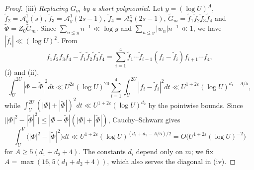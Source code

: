 \documentclass[11pt]{amsart}
\theoremstyle{remark}
\newcommand{\cA}{\mathcal{A}}
\begin{document}
\begin{proof}
(iii) \emph{Replacing $G_m$ by a short polynomial.} Let $y=(\log U)^A$, $\tilde f_2=\cA^1_y(s)$, $\tilde f_3=\cA^1_y(2s-1)$, $\tilde f_4=\cA^{\chi}_y(2s-1)$, $\widetilde G_m=\tilde f_1\tilde f_2\tilde f_3\tilde f_4$ and $\widetilde\Phi=Z_0\widetilde G_m$. Since $\sum_{n\le y}n^{-1}\ll\log y$ and $\sum_{n\le y}|w_n|n^{-1}\ll1$, we have $|\tilde f_i|\ll(\log U)^2$. From
\[
f_1f_2f_3f_4-\tilde f_1\tilde f_2\tilde f_3\tilde f_4=\sum_{i=1}^4\tilde f_1\cdots\tilde f_{i-1}(f_i-\tilde f_i)f_{i+1}\cdots f_4,
\]
(i) and (ii),
\[
\int_U^{2U}|\Phi-\widetilde\Phi|^2dt\ll U^{2\varepsilon}(\log U)^{20}\sum_{i=1}^4\int_U^{2U}|f_i-\tilde f_i|^2dt\ll U^{1+2\varepsilon}(\log U)^{d_1-A/5},
\]
while $\int_U^{2U}(|\Phi|+|\widetilde\Phi|)^2dt\ll U^{1+2\varepsilon}(\log U)^{d_2}$ by the pointwise bounds. Since $\big||\Phi|^2-|\widetilde\Phi|^2\big|\le|\Phi-\widetilde\Phi|(|\Phi|+|\widetilde\Phi|)$, Cauchy--Schwarz gives
\[
\int_U^V\big(|\Phi|^2-|\widetilde\Phi|^2\big)dt\ll U^{1+2\varepsilon}(\log U)^{(d_1+d_2-A/5)/2}=O\big(U^{1+2\varepsilon}(\log U)^{-2}\big)
\]
for $A\ge5(d_1+d_2+4)$. The constants $d_i$ depend only on $m$; we fix $A=\max(16,5(d_1+d_2+4))$, which also serves the diagonal in (iv).


\end{proof}
\end{document}
